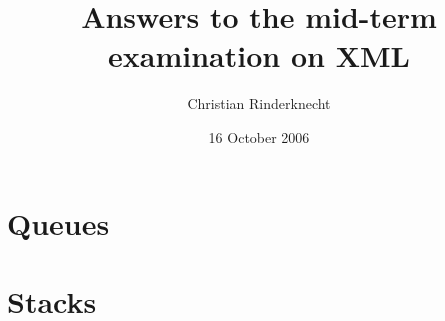 \documentclass[11pt,a4paper]{article}
\title{Answers to the mid-term examination on XML}
\author{Christian Rinderknecht}
\date{16 October 2006}
\begin{document}
\maketitle

\thispagestyle{empty}

\section{Queues}




\section{Stacks}






\end{document}
